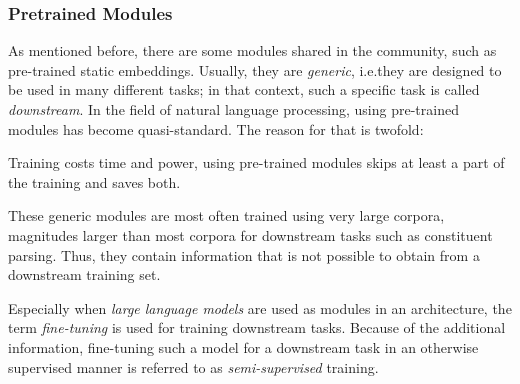 \documentclass[../document.tex]{subfiles}
\begin{document}
    \subsubsection{Pretrained Modules}
    As mentioned before, there are some modules shared in the community, such as pre-trained static embeddings.
    Usually, they are \emph{generic}, i.e.\@ they are designed to be used in many different tasks; in that context, such a specific task is called \emph{downstream}.
    In the field of natural language processing, using pre-trained modules has become quasi-standard.
    The reason for that is twofold:
    \begin{compactitem}
        \item
            Training costs time and power, using pre-trained modules skips at least a part of the training and saves both.
        \item
            These generic modules are most often trained using very large corpora, magnitudes larger than most corpora for downstream tasks such as constituent parsing.
            Thus, they contain information that is not possible to obtain from a downstream training set.
    \end{compactitem}
    Especially when \emph{large language models} are used as modules in an architecture, the term \emph{fine-tuning} is used for training downstream tasks.
    Because of the additional information, fine-tuning such a model for a downstream task in an otherwise supervised manner is referred to as \emph{semi-supervised} training.
\end{document}

